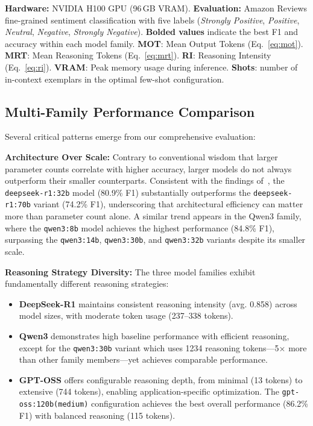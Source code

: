 \documentclass[conference]{IEEEtran}
\newcommand{\deepseekr}[1]{\texttt{deepseek-r1:#1}}
\newcommand{\qwenthree}[1]{\texttt{qwen3:#1}}
\newcommand{\gptoss}[2]{\texttt{gpt-oss:#1(#2)}}
\newcommand{\DeepSeekR}{DeepSeek-R1}
\newcommand{\QwendThree}{Qwen3}
\newcommand{\GPToss}{GPT-OSS}
\begin{document}
\begin{table}[htbp]
\textbf{Hardware:} NVIDIA H100 GPU (96\,GB VRAM).
\textbf{Evaluation:} Amazon Reviews fine-grained sentiment classification with five labels 
(\textit{Strongly Positive}, \textit{Positive}, \textit{Neutral}, \textit{Negative}, \textit{Strongly Negative}). 
\textbf{Bolded values} indicate the best F1 and accuracy within each model family. 
\textbf{MOT}: Mean Output Tokens (Eq.~\ref{eq:mot}).
\textbf{MRT}: Mean Reasoning Tokens (Eq.~\ref{eq:mrt}).
\textbf{RI}: Reasoning Intensity (Eq.~\ref{eq:ri}).
\textbf{VRAM}: Peak memory usage during inference.
\textbf{Shots}: number of in-context exemplars in the optimal few-shot configuration.
\end{table}

\subsection{Multi-Family Performance Comparison}

Several critical patterns emerge from our comprehensive evaluation:

\textbf{Architecture Over Scale:} 
Contrary to conventional wisdom that larger parameter counts correlate with higher accuracy, larger models do not always outperform their smaller counterparts. 
Consistent with the findings of~\cite{huang2025explainable}, the \deepseekr{32b} model (80.9\% F1) substantially outperforms the \deepseekr{70b} variant (74.2\% F1), underscoring that architectural efficiency can matter more than parameter count alone. 
A similar trend appears in the \QwendThree{} family, where the \qwenthree{8b} model achieves the highest performance (84.8\% F1), surpassing the \qwenthree{14b}, \qwenthree{30b}, and \qwenthree{32b} variants despite its smaller scale.

\textbf{Reasoning Strategy Diversity:}
The three model families exhibit fundamentally different reasoning strategies:
\begin{itemize}
    \item \textbf{\DeepSeekR} maintains consistent reasoning intensity (avg. 0.858) across model sizes, with moderate token usage (237--338 tokens).
    
    \item \textbf{\QwendThree} demonstrates high baseline performance with efficient reasoning, except for the \qwenthree{30b} variant which uses 1234 reasoning tokens—5× more than other family members—yet achieves comparable performance.
    
    \item \textbf{\GPToss} offers configurable reasoning depth, from minimal (13 tokens) to extensive (744 tokens), enabling application-specific optimization. The \gptoss{120b}{medium} configuration achieves the best overall performance (86.2\% F1) with balanced reasoning (115 tokens).
\end{itemize}
\end{document}

